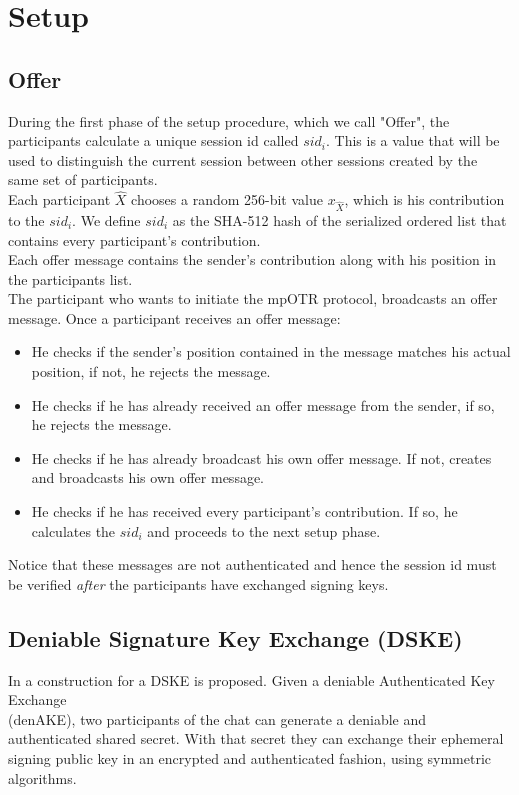 \documentclass[12pt,titlepage,a4paper]{article}
\begin{document}
{\section{Setup}
\subsection{Offer}
\label{Offer}
During the first phase of the setup procedure, which we call "Offer", the participants calculate a unique session id called $sid_i$. This is a value that will be used to distinguish the current session between other sessions created by the same set of participants. \\

Each participant $\hat{X}$ chooses a random 256-bit value $x_{\hat{X}}$, which is his contribution to the $sid_i$. We define $sid_i$ as the SHA-512 hash of the serialized ordered list that contains every participant's contribution. \\

Each offer message contains the sender's contribution along with his position in the participants list. \\

The participant who wants to initiate the mpOTR protocol, broadcasts an offer message. Once a participant receives an offer message:

\begin{itemize}
	\item[]He checks if the sender's position contained in the message matches his actual position, if not, he rejects the message.

	\item[]He checks if he has already received an offer message from the sender, if so, he rejects the message.

	\item[]He checks if he has already broadcast his own offer message. If not, creates and broadcasts his own offer message.

	\item[]He checks if he has received every participant's contribution. If so, he calculates the $sid_i$ and proceeds to the next setup phase.
\end{itemize}

Notice that these messages are not authenticated and hence the session id must
be verified \emph{after} the participants have exchanged signing keys.


\subsection{Deniable Signature Key Exchange (DSKE)}
\label{DSKE}
In \cite{mpotr} a construction for a DSKE is proposed. Given a deniable
Authenticated Key Exchange\\ (denAKE), two participants of the chat can
generate a deniable and authenticated shared secret. With that secret
they can exchange their ephemeral signing public key in an encrypted and
authenticated fashion, using symmetric algorithms.\\

}
\end{document}
